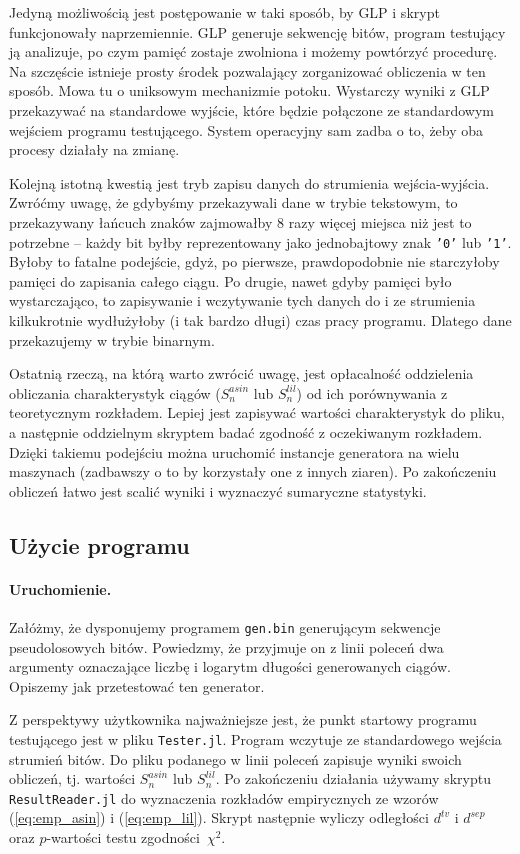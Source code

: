 \documentclass[a4paper,11pt,twoside]{book}
\newcommand{\Slil}[1]{S^{lil}_#1}
\newcommand{\Sasin}[1]{S^{asin}_#1}
\theoremstyle{definition}
\begin{document}
Jedyną możliwością jest postępowanie w taki sposób, by GLP i skrypt funkcjonowały naprzemiennie. GLP generuje sekwencję bitów, program testujący ją analizuje, po czym pamięć zostaje zwolniona i możemy powtórzyć procedurę. Na szczęście istnieje prosty środek pozwalający zorganizować obliczenia w ten sposób. Mowa tu o uniksowym mechanizmie potoku. Wystarczy wyniki z GLP przekazywać na standardowe wyjście, które będzie połączone ze standardowym wejściem programu testującego. System operacyjny sam zadba o to, żeby oba procesy działały na zmianę.

Kolejną istotną kwestią jest tryb zapisu danych do strumienia wejścia-wyjścia. Zwróćmy uwagę, że gdybyśmy przekazywali dane w trybie tekstowym, to przekazywany łańcuch znaków zajmowałby 8 razy więcej miejsca niż jest to potrzebne -- każdy bit byłby reprezentowany jako jednobajtowy znak \texttt{'0'} lub \texttt{'1'}. Byłoby to fatalne podejście, gdyż, po pierwsze, prawdopodobnie nie starczyłoby pamięci do zapisania całego ciągu. Po drugie, nawet gdyby pamięci było wystarczająco, to zapisywanie i wczytywanie tych danych do i ze strumienia kilkukrotnie wydłużyłoby (i tak bardzo długi) czas pracy programu. Dlatego dane przekazujemy w trybie binarnym.

Ostatnią rzeczą, na którą warto zwrócić uwagę, jest opłacalność oddzielenia obliczania charakterystyk ciągów ($\Sasin{n}$ lub $\Slil{n}$) od ich porównywania z teoretycznym rozkładem. Lepiej jest zapisywać wartości charakterystyk do pliku, a następnie oddzielnym skryptem badać zgodność z oczekiwanym rozkładem. Dzięki takiemu podejściu można uruchomić instancje generatora na wielu maszynach (zadbawszy o to by korzystały one z innych ziaren). Po zakończeniu obliczeń łatwo jest scalić wyniki i wyznaczyć sumaryczne statystyki.

\subsection{Użycie programu}
\paragraph{Uruchomienie.}
Załóżmy, że dysponujemy programem \texttt{gen.bin} generującym sekwencje pseudolosowych bitów. Powiedzmy, że przyjmuje on z linii poleceń dwa argumenty oznaczające liczbę i logarytm długości generowanych ciągów. Opiszemy jak przetestować ten generator.

Z perspektywy użytkownika najważniejsze jest, że punkt startowy programu testującego jest w pliku \texttt{Tester.jl}. Program wczytuje ze standardowego wejścia strumień bitów. Do pliku podanego w linii poleceń zapisuje wyniki swoich obliczeń, tj. wartości $\Sasin{n}$ lub $\Slil{n}$. Po zakończeniu działania używamy skryptu \texttt{ResultReader.jl} do wyznaczenia rozkładów empirycznych ze wzorów (\ref{eq:emp_asin}) i (\ref{eq:emp_lil}). Skrypt następnie wyliczy odległości $d^{tv}$ i $d^{sep}$ oraz $p$-wartości testu zgodności~$\chi^2$.
\end{document}
